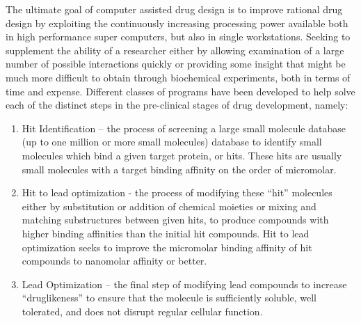 The ultimate goal of computer assisted drug design is to improve rational drug design by exploiting the continuously increasing processing power available both in high performance super computers, but also in single workstations.
Seeking to supplement the ability of a researcher either by allowing examination of a large number of possible interactions quickly or providing some insight that might be much more difficult to obtain through biochemical experiments, both in terms of time and expense.
Different classes of programs have been developed to help solve each of the distinct steps in the pre-clinical stages of drug development, namely:
\begin{enumerate}
\item Hit Identification – the process of screening a large small molecule database (up to one million or more small molecules) database to identify small molecules which bind a given target protein, or hits.
These hits are usually small molecules with a target binding affinity on the order of micromolar.
\item Hit to lead optimization - the process of modifying these ``hit'' molecules either by substitution or addition of chemical moieties or mixing and matching substructures between given hits, to produce compounds with higher binding affinities than the initial hit compounds.
Hit to lead optimization seeks to improve the micromolar binding affinity of hit compounds to nanomolar affinity or better.
\item Lead Optimization – the final step of modifying lead compounds to increase ``druglikeness'' to ensure that the molecule is sufficiently soluble, well tolerated, and does not disrupt regular cellular function.
\end{enumerate}


